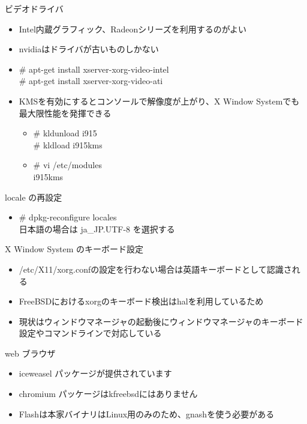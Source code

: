 \begin{frame}[containsverbatim]{ビデオドライバ}
  \begin{itemize}
  \item Intel内蔵グラフィック、Radeonシリーズを利用するのがよい
  \item nvidiaはドライバが古いものしかない
  \item \# apt-get install xserver-xorg-video-intel \\
    \# apt-get install xserver-xorg-video-ati
  \item KMSを有効にするとコンソールで解像度が上がり、X Window Systemでも最大限性能を発揮できる
    \begin{itemize}
    \item \# kldunload i915\\
      \# kldload i915kms
    \item \# vi /etc/modules\\
      i915kms
    \end{itemize}
  \end{itemize}
\end{frame}


\begin{frame}[containsverbatim]{locale の再設定}
  \begin{itemize}
  \item \# dpkg-reconfigure locales\\
    日本語の場合は ja\_JP.UTF-8 を選択する
  \end{itemize}
\end{frame}


\begin{frame}[containsverbatim]{X Window System のキーボード設定}
  \begin{itemize}
  \item /etc/X11/xorg.confの設定を行わない場合は英語キーボードとして認識される
  \item FreeBSDにおけるxorgのキーボード検出はhalを利用しているため
  \item 現状はウィンドウマネージャの起動後にウィンドウマネージャのキーボード設定やコマンドラインで対応している
  \end{itemize}
\end{frame}


\begin{frame}[containsverbatim]{web ブラウザ}
  \begin{itemize}
  \item iceweasel パッケージが提供されています
  \item chromium パッケージはkfreebsdにはありません
  \item Flashは本家バイナリはLinux用のみのため、gnashを使う必要がある
  \end{itemize}
\end{frame}


